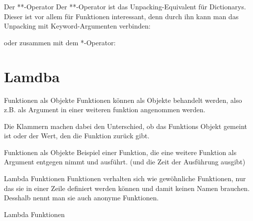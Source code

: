 \begin{frame}{Der **-Operator}
	Der **-Operator ist das Unpacking-Equivalent für Dictionarys. Dieser ist vor allem für Funktionen interessant, denn durch ihn kann man das Unpacking mit Keyword-Argumenten verbinden:
	
	oder zusammen mit dem *-Operator:
	
\end{frame}



\section{Lamdba}

\begin{frame}{Funktionen als Objekte}
	Funktionen können als Objekte behandelt werden, also z.B. als Argument in einer weiteren funktion angenommen werden.
	
	
	Die Klammern machen dabei den Unterschied, ob das Funktions Objekt gemeint ist oder der Wert, den die Funktion zurück gibt.
\end{frame}

\begin{frame}{Funktionen als Objekte}
	Beispiel einer Funktion, die eine weitere Funktion  als Argument entgegen nimmt und ausführt. (und die Zeit der Ausführung ausgibt) 
	
\end{frame}

\begin{frame}{Lambda Funktionen}
	 Funktionen verhalten sich wie gewöhnliche Funktionen, nur das sie in einer Zeile definiert werden können und damit keinen Namen brauchen. Desshalb nennt man sie auch \alert{anonyme Funktionen}.
	
\end{frame}{Lambda Funktionen}


